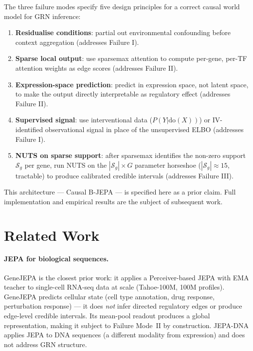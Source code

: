 \documentclass[11pt]{article}
\begin{document}
The three failure modes specify five design principles for a correct causal world
model for GRN inference:
\begin{enumerate}
  \item \textbf{Residualise conditions}: partial out environmental confounding
    before context aggregation (addresses Failure I).
  \item \textbf{Sparse local output}: use sparsemax attention
    \citep{martins2016} to compute per-gene, per-TF attention weights as edge
    scores (addresses Failure II).
  \item \textbf{Expression-space prediction}: predict in expression space, not
    latent space, to make the output directly interpretable as regulatory effect
    (addresses Failure II).
  \item \textbf{Supervised signal}: use interventional data ($P(Y|\mathrm{do}(X))$)
    or IV-identified observational signal in place of the unsupervised ELBO
    (addresses Failure I).
  \item \textbf{NUTS on sparse support}: after sparsemax identifies the
    non-zero support $\mathcal{S}_g$ per gene, run NUTS on the $|\mathcal{S}_g| \times G$
    parameter horseshoe ($|\mathcal{S}_g| \approx 15$, tractable)
    to produce calibrated credible intervals (addresses Failure III).
\end{enumerate}
This architecture --- Causal B-JEPA --- is specified here as a prior claim.
Full implementation and empirical results are the subject of subsequent work.

\section{Related Work}

\paragraph{JEPA for biological sequences.}
GeneJEPA \citep{genejepa2025} is the closest prior work: it applies a
Perceiver-based JEPA with EMA teacher to single-cell RNA-seq data at scale
(Tahoe-100M, 100M profiles).
GeneJEPA predicts cellular state (cell type annotation, drug response,
perturbation response) --- it does \emph{not} infer directed regulatory edges
or produce edge-level credible intervals.
Its mean-pool readout produces a global representation, making it subject to
Failure Mode~II by construction.
JEPA-DNA \citep{assael2024} applies JEPA to DNA sequences (a different modality
from expression) and does not address GRN structure.
\end{document}
